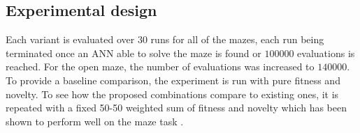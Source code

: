 \subsection{Experimental design}
\label{subsection:design}
Each variant is evaluated over $30$ runs for all of the mazes, each run being terminated once an ANN
able to solve the maze is found or $100 000$ evaluations is reached. For the open maze, the number of
evaluations was increased to $140 000$.
To provide a baseline comparison, the experiment is run with pure fitness and novelty. To see how
the proposed combinations compare to existing ones, it is repeated with a fixed 50-50 weighted sum
of fitness and novelty which has been shown to perform well on the maze task \cite{ns_study}.
